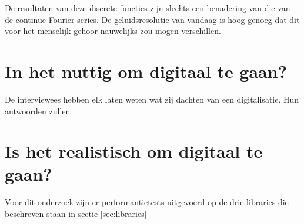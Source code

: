 De resultaten van deze discrete functies zijn slechts een benadering van die van de continue Fourier series. \autocite{fourier} De geluidsresolutie van vandaag is hoog genoeg dat dit voor het menselijk gehoor nauwelijks zou mogen verschillen. \autocite{peterboone}

\section{In het nuttig om digitaal te gaan?}

De interviewees hebben elk laten weten wat zij dachten van een digitalisatie. Hun antwoorden zullen 

\section{Is het realistisch om digitaal te gaan?}

Voor dit onderzoek zijn er performantietests uitgevoerd op de drie libraries die beschreven staan in sectie \ref{sec:libraries}


